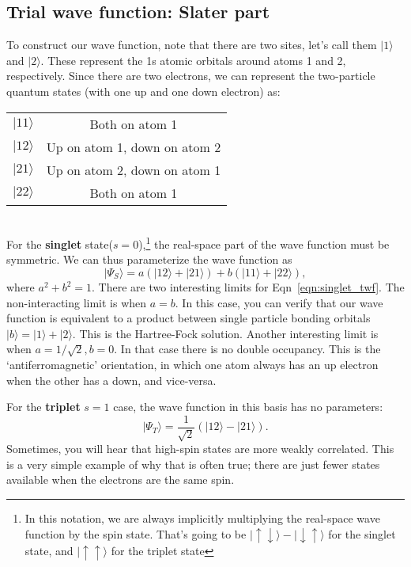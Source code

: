 \documentclass[12pt]{article}
\begin{document}
\subsection*{Trial wave function: Slater part}

To construct our wave function, note that there are two sites, let's call them $|1\rangle$ and $|2\rangle$. 
These represent the 1s atomic orbitals around atoms 1 and 2, respectively. 
Since there are two electrons, we can represent the two-particle quantum states (with one up and one down electron) as: \\
\begin{tabular}{lc}
$|11\rangle$ & Both on atom 1 \\
$|12\rangle$ & Up on atom 1, down on atom 2 \\
$|21\rangle$ & Up on atom 2, down on atom 1 \\
$|22\rangle$ & Both on atom 1 \\
\end{tabular}\\

For the {\bf singlet} state($s=0$),\footnote{In this notation, we are always implicitly multiplying the real-space wave function by the spin state. That's going to be $|\uparrow\downarrow \rangle - |\downarrow\uparrow\rangle$ for the singlet state, and $|\uparrow\uparrow\rangle$ for the triplet state} the real-space part of the wave function must be symmetric. 
We can thus parameterize the wave function as 
\begin{equation}
|\Psi_S\rangle = a\left(|12\rangle + |21\rangle\right) + b\left(|11\rangle + |22\rangle\right),
\label{eqn:singlet_twf}
\end{equation}
where $a^2+b^2=1$. 
There are two interesting limits for Eqn~\ref{eqn:singlet_twf}. 
The non-interacting limit is when $a=b$. 
In this case, you can verify that our wave function is equivalent to a product between single particle bonding orbitals $|b\rangle=|1\rangle + |2\rangle$.
This is the Hartree-Fock solution.
Another interesting limit is when $a=1/\sqrt{2},b=0$. 
In that case there is no double occupancy. 
This is the `antiferromagnetic' orientation, in which one atom always has an up electron when the other has a down, and vice-versa.


For the {\bf triplet} $s=1$ case, the wave function in this basis has no parameters:
\begin{equation}
|\Psi_T\rangle = \frac{1}{\sqrt{2}}\left(|12\rangle - |21\rangle\right).
\label{eqn:triplet_twf}
\end{equation}
Sometimes, you will hear that high-spin states are more weakly correlated. 
This is a very simple example of why that is often true; there are just fewer states available when the electrons are the same spin.
\end{document}
